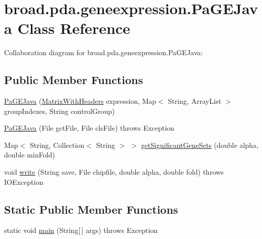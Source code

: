 \hypertarget{classbroad_1_1pda_1_1geneexpression_1_1_pa_g_e_java}{\section{broad.\+pda.\+geneexpression.\+Pa\+G\+E\+Java Class Reference}
\label{classbroad_1_1pda_1_1geneexpression_1_1_pa_g_e_java}
}


Collaboration diagram for broad.\+pda.\+geneexpression.\+Pa\+G\+E\+Java\+:
\subsection*{Public Member Functions}
\begin{DoxyCompactItemize}
\item 
\hyperlink{classbroad_1_1pda_1_1geneexpression_1_1_pa_g_e_java_a0ac8c137e977a564dff9377f67ce561c}{Pa\+G\+E\+Java} (\hyperlink{classbroad_1_1core_1_1datastructures_1_1_matrix_with_headers}{Matrix\+With\+Headers} expression, Map$<$ String, Array\+List $>$ group\+Indexes, String control\+Group)
\item 
\hyperlink{classbroad_1_1pda_1_1geneexpression_1_1_pa_g_e_java_a2d29aa7cba646afa87da68fd8695c7a9}{Pa\+G\+E\+Java} (File gct\+File, File cls\+File)  throws Exception
\item 
Map$<$ String, Collection$<$ String $>$ $>$ \hyperlink{classbroad_1_1pda_1_1geneexpression_1_1_pa_g_e_java_a6f3931ef76b19b908e94c5ae859e056e}{get\+Significant\+Gene\+Sets} (double alpha, double min\+Fold)
\item 
void \hyperlink{classbroad_1_1pda_1_1geneexpression_1_1_pa_g_e_java_a000d0be65609f1883d6a1ddadf64fc4c}{write} (String save, File chipfile, double alpha, double fold)  throws I\+O\+Exception
\end{DoxyCompactItemize}
\subsection*{Static Public Member Functions}
\begin{DoxyCompactItemize}
\item 
static void \hyperlink{classbroad_1_1pda_1_1geneexpression_1_1_pa_g_e_java_abec7bbb75bff6e228d4781dfc898432f}{main} (String\mbox{[}$\,$\mbox{]} args)  throws Exception
\end{DoxyCompactItemize}


